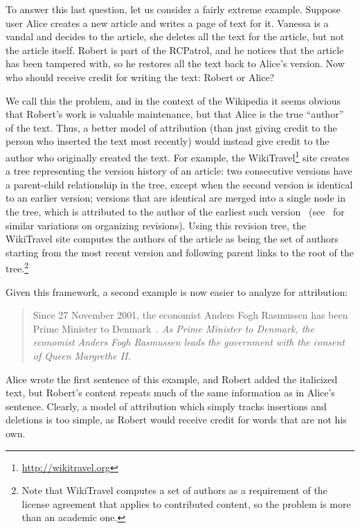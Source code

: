 To answer this last question, let us consider a fairly extreme example.
Suppose user Alice creates a new article and writes a page of text for it.
Vanessa is a vandal and decides to  the article,
\ie she deletes all the text for the article, but not the article itself.
Robert is part of the RCPatrol, and he notices that the article has
been tampered with, so he restores all the text back to Alice's version.
Now who should receive credit for writing the text: Robert or Alice?

We call this the  problem,
and in the context of the Wikipedia it seems obvious that Robert's
work is valuable maintenance, but that Alice is the true ``author'' of the text.
Thus, a better model of attribution (than just giving credit
to the person who inserted the text most recently) would instead give credit
to the author who originally created the text.
For example, the WikiTravel\footnote{\url{http://wikitravel.org}}
site creates a tree representing
the version history of an article: two consecutive versions
have a parent-child relationship in the tree, except when
the second version is identical to an earlier version;
versions that are identical are merged into a single node
in the tree, which is attributed to the author of the earliest
such version~\cite{WikiTravelAuthorship}
(see~\cite{Ekstrand2009,Sabel2007} for similar variations
on organizing revisions).
Using this revision tree, the WikiTravel site computes the
authors of the article as being the set of authors starting
from the most recent version and following parent links
to the root of the tree.\footnote{Note that WikiTravel
computes a set of authors as a requirement
of the license agreement that applies to contributed content,
so the problem is more than an academic one.}


Given this framework,
a second example is now easier to analyze for attribution:
%
\begin{quote}
Since 27 November 2001, the economist Anders Fogh Rasmussen
has been Prime Minister to Denmark~\cite{wiki:Denmark-Fogh}.
\textit{As Prime Minister to Denmark, the economist Anders Fogh Rasmussen
leads the government with the consent of Queen Margrethe II.}
\end{quote}
%
Alice wrote the first sentence of this example, and Robert
added the italicized text,
but Robert's content repeats much of the same information as
in Alice's sentence.
Clearly, a model of attribution which simply tracks insertions
and deletions is too simple, as Robert
would receive credit for words that are not his own.


